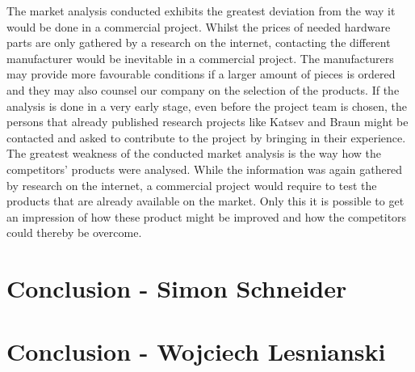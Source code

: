 The market analysis conducted exhibits the greatest deviation from the way it
would be done in a commercial project. Whilst the prices of needed hardware
parts are only gathered by a research on the internet, contacting the different
manufacturer would be inevitable in a commercial project. The manufacturers may
provide more favourable conditions if a larger amount of pieces is ordered and
they may also counsel our company on the selection of the products. If the
analysis is done in a very early stage, even before the project team is chosen,
the persons that already published research projects like Katsev and Braun might
be contacted and asked to contribute to the project by bringing in their
experience. The greatest weakness of the conducted market analysis is the way
how the competitors' products were analysed. While the information was again
gathered by research on the internet, a commercial project would require to test
the products that are already available on the market. Only this it is possible
to get an impression of how these product might be improved and how the
competitors could thereby be overcome.

\section{Conclusion - Simon Schneider}

\section{Conclusion - Wojciech Lesnianski} 